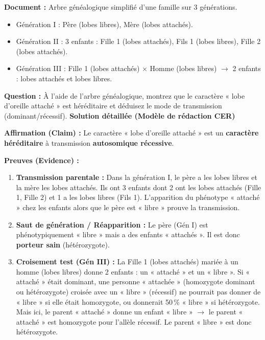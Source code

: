 \documentclass[11pt]{article}
\begin{document}
\begin{exoresolu}
\textbf{Document :} Arbre généalogique simplifié d'une famille sur 3 générations.
\begin{itemize}
    \item Génération I : Père (lobes libres), Mère (lobes attachés).
    \item Génération II : 3 enfants : Fille 1 (lobes attachés), Fils 1 (lobes libres), Fille 2 (lobes attachés).
    \item Génération III : Fille 1 (lobes attachés) $\times$ Homme (lobes libres) $\rightarrow$ 2 enfants : lobes attachés et lobes libres.
\end{itemize}
\textbf{Question :} À l'aide de l'arbre généalogique, montrez que le caractère « lobe d'oreille attaché » est héréditaire et déduisez le mode de transmission (dominant/récessif).
\tcblower
\textbf{Solution détaillée (Modèle de rédaction CER)}

\textbf{Affirmation (Claim) :} Le caractère « lobe d'oreille attaché » est un \textbf{caractère héréditaire} à transmission \textbf{autosomique récessive}.

\textbf{Preuves (Evidence) :}
\begin{enumerate}
    \item \textbf{Transmission parentale :} Dans la génération I, le père a les lobes libres et la mère les lobes attachés. Ils ont 3 enfants dont 2 ont les lobes attachés (Fille 1, Fille 2) et 1 a les lobes libres (Fils 1). L'apparition du phénotype « attaché » chez les enfants alors que le père est « libre » prouve la transmission.
    \item \textbf{Saut de génération / Réapparition :} Le père (Gén I) est phénotypiquement « libre » mais a des enfants « attachés ». Il est donc \textbf{porteur sain} (hétérozygote).
    \item \textbf{Croisement test (Gén III) :} La Fille 1 (lobes attachés) mariée à un homme (lobes libres) donne 2 enfants : un « attaché » et un « libre ». Si « attaché » était dominant, une personne « attachée » (homozygote dominant ou hétérozygote) croisée avec un « libre » (récessif) ne pourrait pas donner de « libre » si elle était homozygote, ou donnerait 50\,\% « libre » si hétérozygote. Mais ici, le parent « attaché » donne un enfant « libre » $\rightarrow$ le parent « attaché » est homozygote pour l'allèle récessif. Le parent « libre » est donc hétérozygote.
\end{enumerate}


\end{exoresolu}
\end{document}
